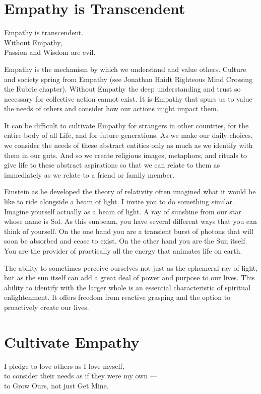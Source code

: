 \documentclass[ebook,12pt,openany,twoside]{memoir}
\newcommand{\tab}{\hspace*{2em}}
\newcommand{\imagefacingchapter}[1]{
  \cleartoverso
  \clearpage \null
  \thispagestyle{cleared}
  \AddToShipoutPictureBG*{%
    \AtStockLowerLeft{%
      \texttt{[image: \#1]}
    }
  }
  \clearpage
}
\begin{document}
\chapter{Empathy is Transcendent}

\setlength\epigraphwidth{2.8in}
\epigraph{
  Empathy is transcendent.\\
  Without Empathy,\\
  \tab Passion and Wisdom are evil.
}{}

\noindent Empathy is the mechanism by which we understand and value others. Culture and society spring from Empathy (see Jonathan Haidt Righteous Mind
Crossing the Rubric chapter). Without Empathy the deep understanding and trust
so necessary for collective action cannot exist. It is Empathy that spurs us to
value the needs of others and consider how our actions might impact them.

It can be difficult to cultivate Empathy for strangers in other countries, for the entire body of all Life, and for future generations.  As we make our daily choices, we consider the needs of these abstract entities only as much as we identify with them in our guts.
And so we create religious images, metaphors, and rituals to give life to these abstract aspirations so that we can relate to them as immediately as we relate to a friend or family member.

Einstein as he developed the theory of relativity often imagined what
it would be like to ride alongside a beam of light. I invite you to do
something similar. Imagine yourself actually as a beam of light. A ray of
sunshine from our star whose name is Sol. As this sunbeam, you have several
different ways that you can think of yourself. On the one hand you are a
transient burst of photons that will soon be absorbed and cease to exist. On
the other hand you are the Sun itself. You are the provider of practically all
the energy that animates life on earth.

The ability to sometimes perceive ourselves not just as the ephemeral ray of
light, but as the sun itself can add a great deal of power and purpose to our
lives. This ability to identify with the larger whole is an essential
characteristic of spiritual enlightenment. It offers freedom from reactive
grasping and the option to proactively create our lives.




\imagefacingchapter{images/CultivateEmpathy}
\chapter{Cultivate Empathy}
\setlength\epigraphwidth{2.8in}
\epigraph{
  I pledge to love others as I love myself,\\
  to consider their needs as if they were my own ---\\
  \tab to Grow Ours, not just Get Mine.
}{}
\end{document}
